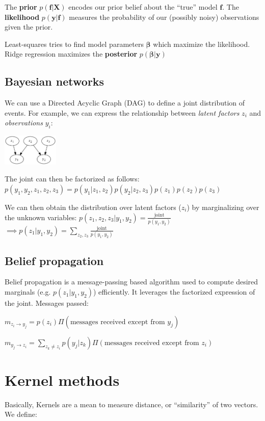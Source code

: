 \documentclass[10pt,a4paper,landscape]{article}
\providecommand{\bf}[1]{\ensuremath{\mathbf{#1}}}
\begin{document}
\begin{multicols*}{4}
The \textbf{prior} $p(\bf{f}|\bf{X})$ encodes our prior belief about the ``true'' model $\bf{f}$. The \textbf{likelihood} $p(\bf{y}|\bf{f})$ measures the probability of our (possibly noisy) observations given the prior.

Least-squares tries to find model parameters $\bf{\beta}$ which maximize the likelihood. Ridge regression maximizes the \textbf{posterior} $p(\bf{\beta}|\bf{y})$

\subsection{Bayesian networks}
We can use a Directed Acyclic Graph (DAG) to define a joint distribution of events. For example, we can express the relationship between \textit{latent factors} $z_i$ and \textit{observations} $y_i$:

\begin{colfig}
  \centering
  \includegraphics[height=1.5cm]{images/bayesian-network.png}
\end{colfig}

The joint can then be factorized as follows:
$p(y_1, y_2, z_1, z_2, z_3) = p(y_1 | z_1, z_2) p(y_2 | z_2, z_3) p(z_1) p(z_2) p(z_3)$

We can then obtain the distribution over latent factors ($z_i$) by marginalizing over the unknown variables:
$p(z_1, z_2, z_3 | y_1, y_2) = \frac{\text{joint}}{p(y_1, y_2)}$\\
$\implies p(z_1 | y_1, y_2) = \sum_{z_2, z_3} \frac{\text{joint}}{p(y_1, y_2)}$

\subsection{Belief propagation}
Belief propagation is a message-passing based algorithm used to compute desired marginals (e.g. $p(z_1 | y_1, y_2)$) efficiently. It leverages the factorized expression of the joint. Messages passed:

$m_{z_i \rightarrow y_j} = p(z_i) \Pi(\text{messages received except from } y_j)$

$m_{y_j \rightarrow z_i} = \sum_{z_k \neq z_i} p(y_j | z_k) \Pi(\text{messages received except from } z_i)$

\section{Kernel methods}
Basically, Kernels are a mean to measure distance, or ``similarity'' of two vectors. We define:


\end{multicols*}
\end{document}
